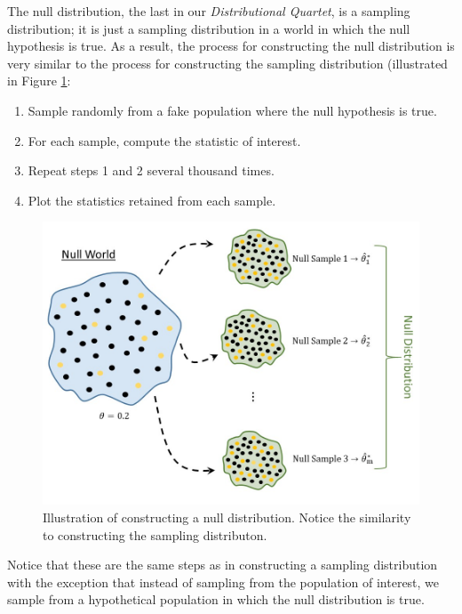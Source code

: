 \documentclass[]{book}
\providecommand{\tightlist}{%
  \setlength{\itemsep}{0pt}\setlength{\parskip}{0pt}}
\theoremstyle{plain}
\theoremstyle{mydefn}
\theoremstyle{myexmpl}
\theoremstyle{remark}
\begin{document}
The null distribution, the last in our \emph{Distributional Quartet}, is
a sampling distribution; it is just a sampling distribution in a world
in which the null hypothesis is true. As a result, the process for
constructing the null distribution is very similar to the process for
constructing the sampling distribution (illustrated in Figure
\ref{fig:nulldistns-null-distribution}:

\begin{enumerate}
\def\labelenumi{\arabic{enumi}.}
\tightlist
\item
  Sample randomly from a fake population where the null hypothesis is
  true.
\item
  For each sample, compute the statistic of interest.
\item
  Repeat steps 1 and 2 several thousand times.
\item
  Plot the statistics retained from each sample.
\end{enumerate}

\begin{figure}

{\centering \includegraphics[width=0.8\linewidth]{./images/NullDistns-Null-Distribution} 

}

\caption{Illustration of constructing a null distribution.  Notice the similarity to constructing the sampling distributon.}\label{fig:nulldistns-null-distribution}
\end{figure}

Notice that these are the same steps as in constructing a sampling
distribution with the exception that instead of sampling from the
population of interest, we sample from a hypothetical population in
which the null distribution is true.
\end{document}
